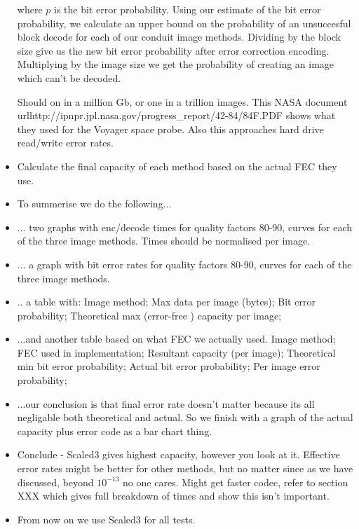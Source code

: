 \begin{itemize}
where $p$ is the bit error probability. Using our estimate of the bit error probability, we calculate an upper bound on the probability of an unsuccesful block decode for each of our conduit image methods. Dividing by the block size give us the new bit error probability after error correction encoding. Multiplying by the image size we get the probability of creating an image which can't be decoded.

Should on in a million Gb, or one in a trillion images. This NASA document url{http://ipnpr.jpl.nasa.gov/progress\_report/42-84/84F.PDF} shows what they used for the Voyager space probe. Also this approaches hard drive read/write error rates.

\item Calculate the final capacity of each method based on the actual FEC they use.

\item To summerise we do the following...

\item ... two graphs with enc/decode times for quality factors 80-90, curves for each of the three image methods. Times should be normalised per image.

\item ... a graph with bit error rates for quality factors 80-90, curves for each of the three image methods.

\item .. a table with: Image method; Max data per image (bytes); Bit error probability; Theoretical max (error-free ) capacity per image;

\item ...and another table based on what FEC we actually used. Image method; FEC used in implementation; Resultant capacity (per image); Theoretical min bit error probability; Actual bit error probability; Per image error probability;

\item ...our conclusion is that final error rate doesn't matter because its all negligable both theoretical and actual. So we finish with a graph of the actual capacity plus error code as a bar chart thing.

\item Conclude - Scaled3 gives highest capacity, however you look at it. Effective error rates might be better for other methods, but no matter since as we have discussed, beyond $10^{-13}$ no one cares. Might get faster codec, refer to section XXX which gives full breakdown of times and show this isn't important.

\item From now on we use Scaled3 for all tests.
\end{itemize} 


